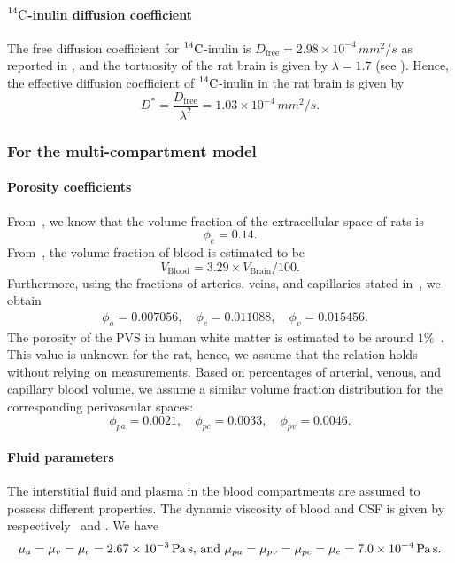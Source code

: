 \documentclass[10pt]{article}
\newcommand{\1}{^{(1)}}
\newcommand{\2}{^{(2)}}
\newcommand{\Cinulin}{$\prescript{14}{}{\text{C}}$-inulin }
\begin{document}
\paragraph{\Cinulin diffusion coefficient}
The free diffusion coefficient for \Cinulin is $ D_\text{free} = 2.98 \times 10^{-4} \, \si{mm^2/s}$ as reported in \cite{lanman1971diffusion}, and the tortuosity of the rat brain is given by $ \lambda=1.7 $ (see \cite{Waters-2011-AB}). Hence, the effective diffusion coefficient of \Cinulin in the rat brain is given by
\[ 
  D^{*} = \frac{D_\text{free}}{\lambda^2} = 1.03\times 10^{-4} \, \si{mm^2/s}.
\]


\subsubsection{For the multi-compartment model}

\paragraph{Porosity coefficients}
From~\cite{Cserr-1991-Extracellular}, we know that the volume fraction of the extracellular space of rats is
\[
    \phi_e = 0.14.
\]
From~\cite{Adriana-2007-MR}, the volume fraction of blood is estimated to be 
\[
    V_\text{Blood} = 3.29 \times V_\text{Brain}/100.
\]
Furthermore, using the fractions of arteries, veins, and capillaries stated in~\cite{Qin-2019-Cerebral}, we obtain
\[
\begin{aligned}
    &\phi_a = 0.007056, \quad \phi_c = 0.011088,\quad \phi_v = 0.015456.
\end{aligned}
\]
The porosity of the PVS in human white matter is estimated to be around $1\%$~\cite{Barisano}. This value is unknown for the rat, hence, we assume that the relation holds without relying on measurements. 
Based on percentages of arterial, venous, and capillary blood volume, we assume a similar volume fraction distribution for the corresponding perivascular spaces: 
\[
    \phi_{pa} = 0.0021, \quad \phi_{pc} = 0.0033,\quad \phi_{pv} = 0.0046.
\]


\paragraph{Fluid parameters}

The interstitial fluid and plasma in the blood compartments are assumed to possess different properties. 
The dynamic viscosity of blood and CSF is given by respectively~\cite{Guo-2019-MPET} and \cite{bloomfield1998effects}. We have 
\[
    \mu_a = \mu_v = \mu_c = 2.67 \times 10^{-3} \, \text{\si{\pascal \second}, and }  \mu_{pa} = \mu_{pv} = \mu_{pc}  = \mu_e = 7.0 \times 10^{-4}\, \text{\si{\pascal \second}}.
\]
\end{document}
